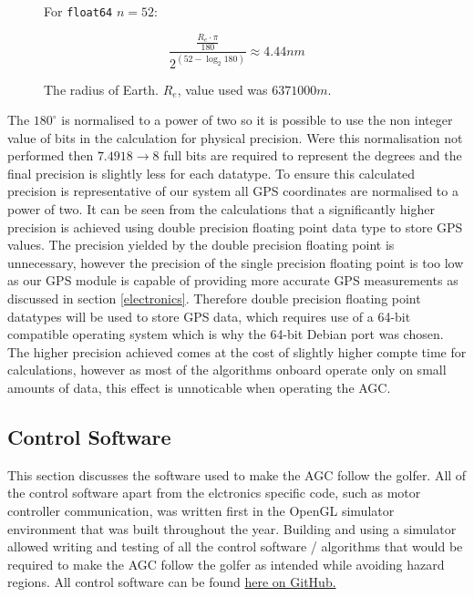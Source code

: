 \documentclass[11pt,landscape]{article}
\begin{document}
\begin{multicols}{3}
\begin{figure}[H]
\begin{mdframed}
\begin{center}
                \begin{minipage}{0.45\textwidth}
                    \begin{mdframed}
                For \verb|float64| $n=52$:
                \begin{center}
                    \begin{equation*}
                        \frac{\frac{R_e \cdot \pi}{180}}{2^{\left(52 - \log_2{180}\right)}} \approx 4.44nm
                    \end{equation*}
                \end{center}
            \end{mdframed}
            \end{minipage}
        \end{center}
        \center The radius of Earth. $R_e$, value used was $6371000m$. 
    \end{mdframed} 
    \label{fig:float_calcs}
\end{figure}
The $180^{\circ}$ is normalised to a power of two so it is possible to use the
non integer value of bits in the calculation for physical precision. Were this
normalisation not performed then $7.4918\rightarrow8$ full bits are required to
represent the degrees and the final precision is slightly less for each
datatype. To ensure this calculated precision is representative of our system
all GPS coordinates are normalised to a power of two. It can be seen from the
calculations that a significantly higher precision is achieved using double
precision floating point data type to store GPS values. The precision yielded by
the double precision floating point is unnecessary, however the precision of the
single precision floating point is too low as our GPS module is capable of
providing more accurate GPS measurements as discussed in section
\ref{electronics}. Therefore double precision floating point datatypes will be
used to store GPS data, which requires use of a 64-bit compatible operating
system which is why the 64-bit Debian port was chosen. The higher precision
achieved comes at the cost of slightly higher compte time for calculations,
however as most of the algorithms onboard operate only on small amounts of data,
this effect is unnoticable when operating the AGC.

\subsection{Control Software}
\label{control_software}
This section discusses the software used to make the AGC follow the golfer. All
of the control software apart from the elctronics specific code, such as motor
controller communication, was written first in the OpenGL simulator environment
that was built throughout the year. Building and using a simulator allowed
writing and testing of all the control software / algorithms that would be
required to make the AGC follow the golfer as intended while avoiding hazard
regions. All control software can be found
\href{https://github.com/GDP-50/Onboard-RasPi}{here on GitHub.}


\end{multicols}
\end{document}
